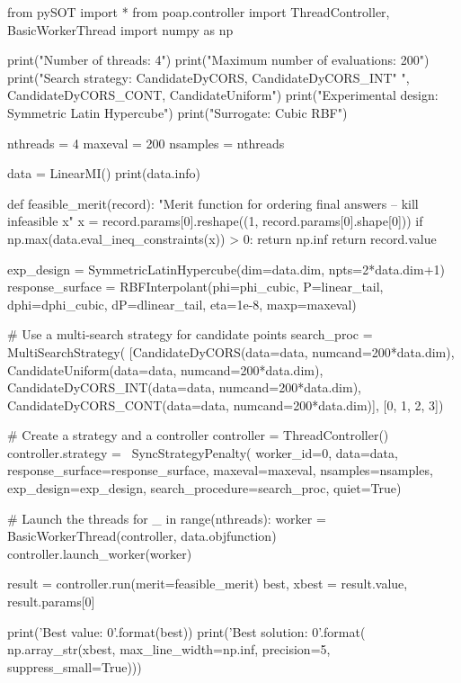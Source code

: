 \documentclass[]{article}
\begin{document}
\begin{python}
from pySOT import *
from poap.controller import ThreadController, BasicWorkerThread
import numpy as np

print("Number of threads: 4")
print("Maximum number of evaluations: 200")
print("Search strategy: CandidateDyCORS, CandidateDyCORS_INT"
      ", CandidateDyCORS_CONT, CandidateUniform")
print("Experimental design: Symmetric Latin Hypercube")
print("Surrogate: Cubic RBF")

nthreads = 4
maxeval = 200
nsamples = nthreads

data = LinearMI()
print(data.info)

def feasible_merit(record):
    "Merit function for ordering final answers -- kill infeasible x"
    x = record.params[0].reshape((1, record.params[0].shape[0]))
    if np.max(data.eval_ineq_constraints(x)) > 0:
        return np.inf
    return record.value

exp_design = SymmetricLatinHypercube(dim=data.dim, npts=2*data.dim+1)
response_surface = RBFInterpolant(phi=phi_cubic, P=linear_tail,
                                  dphi=dphi_cubic, dP=dlinear_tail,
                                  eta=1e-8, maxp=maxeval)

# Use a multi-search strategy for candidate points
search_proc = MultiSearchStrategy(
    [CandidateDyCORS(data=data, numcand=200*data.dim),
     CandidateUniform(data=data, numcand=200*data.dim),
     CandidateDyCORS_INT(data=data, numcand=200*data.dim),
     CandidateDyCORS_CONT(data=data, numcand=200*data.dim)],
    [0, 1, 2, 3])

# Create a strategy and a controller
controller = ThreadController()
controller.strategy = \
    SyncStrategyPenalty( 
        worker_id=0, data=data,
        response_surface=response_surface,
        maxeval=maxeval, nsamples=nsamples,
        exp_design=exp_design,
        search_procedure=search_proc,
        quiet=True)

# Launch the threads
for _ in range(nthreads): 
    worker = BasicWorkerThread(controller, data.objfunction)
    controller.launch_worker(worker)

result = controller.run(merit=feasible_merit)
best, xbest = result.value, result.params[0]

print('Best value: {0}'.format(best))
print('Best solution: {0}'.format(
    np.array_str(xbest, max_line_width=np.inf,
                 precision=5, suppress_small=True)))
\end{python}
\end{document}
